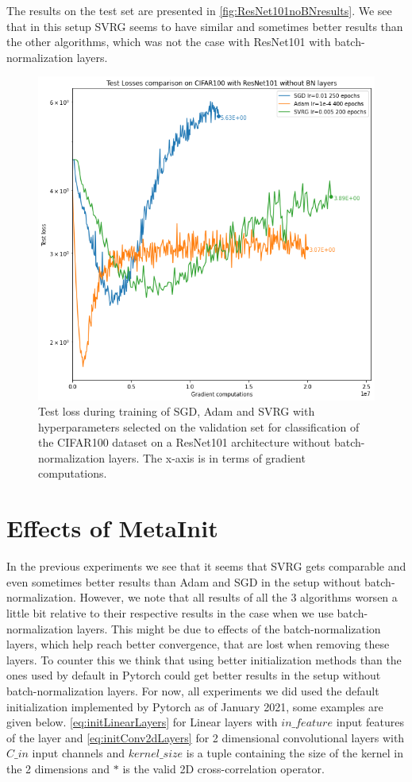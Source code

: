 \documentclass[a4paper,11pt,oneside]{report}
\begin{document}
The results on the test set are presented in \autoref{fig:ResNet101noBNresults}. We see that in this setup SVRG seems to have similar and sometimes better results than the other algorithms, which was not the case with ResNet101 with batch-normalization layers. 

\begin{figure}
    \centering
    \includegraphics[width=\columnwidth]{figures/ResNet101noBNResults.png}
    \caption{Test loss during training of SGD, Adam and SVRG with hyperparameters selected on the validation set for classification of the CIFAR100 dataset on a ResNet101 architecture without batch-normalization layers. The x-axis is in terms of gradient computations.}
    \label{fig:ResNet101noBNresults}
\end{figure}

\section{Effects of MetaInit}
In the previous experiments we see that it seems that SVRG gets comparable and even sometimes better results than Adam and SGD in the setup without batch-normalization. 
However, we note that all results of all the 3 algorithms worsen a little bit relative to their respective results in the case when we use batch-normalization layers. 
This might be due to effects of the batch-normalization layers, which help reach better convergence, that are lost when removing these layers.
To counter this we think that using better initialization methods than the ones used by default in Pytorch could get better results in the setup without batch-normalization layers.
For now, all experiments we did used the default initialization implemented by Pytorch as of January 2021, some examples are given below.
\autoref{eq:initLinearLayers} for Linear layers with $in\_feature$ input features of the layer and \autoref{eq:initConv2dLayers} for 2 dimensional convolutional layers with $C\_in$ input channels and $kernel\_size$ is a tuple containing the size of the kernel in the 2 dimensions and $*$ is the valid 2D cross-correlation operator. 
\end{document}
